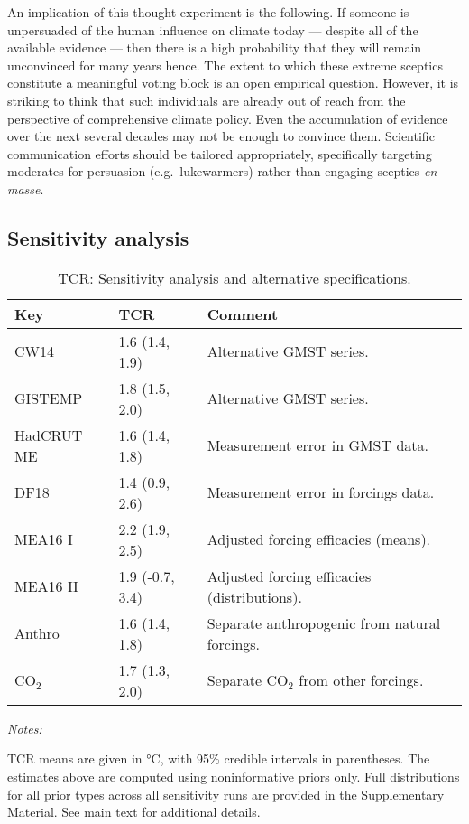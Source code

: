 \documentclass[smallextended]{svjour3}       %
\begin{document}
An implication of this thought experiment is the following. If someone
is unpersuaded of the human influence on climate today --- despite all
of the available evidence --- then there is a high probability that they
will remain unconvinced for many years hence. The extent to which these
extreme sceptics constitute a meaningful voting block is an open
empirical question. However, it is striking to think that such
individuals are already out of reach from the perspective of
comprehensive climate policy. Even the accumulation of evidence over the
next several decades may not be enough to convince them. Scientific
communication efforts should be tailored appropriately, specifically
targeting moderates for persuasion (e.g.~lukewarmers) rather than
engaging sceptics \emph{en masse}.

\hypertarget{sec:sensitivity}{%
\subsection{Sensitivity analysis}\label{sec:sensitivity}}

\begin{table}

\caption{\label{tab:sens_tab}TCR: Sensitivity analysis and alternative specifications. \label{tab:sensitivity}}
\centering
\begin{threeparttable}
\begin{tabular}[t]{lll}
\toprule
Key & TCR & Comment\\
\midrule
CW14 & 1.6 (1.4, 1.9) & Alternative GMST series.\\
GISTEMP & 1.8 (1.5, 2.0) & Alternative GMST series.\\
HadCRUT ME & 1.6 (1.4, 1.8) & Measurement error in GMST data.\\
DF18 & 1.4 (0.9, 2.6) & Measurement error in forcings data.\\
MEA16 I & 2.2 (1.9, 2.5) & Adjusted forcing efficacies (means).\\
\addlinespace
MEA16 II & 1.9 (-0.7, 3.4) & Adjusted forcing efficacies (distributions).\\
Anthro & 1.6 (1.4, 1.8) & Separate anthropogenic from natural forcings.\\
CO$_2$ & 1.7 (1.3, 2.0) & Separate CO$_2$ from other forcings.\\
\bottomrule
\end{tabular}
\begin{tablenotes}[para]
\item \textit{Notes:} 
\item TCR means are given in °C, with 95\% credible intervals in parentheses. The estimates above are computed using noninformative priors only. Full distributions for all prior types across all sensitivity runs are provided in the Supplementary Material. See main text for additional details.
\end{tablenotes}
\end{threeparttable}
\end{table}
\end{document}
